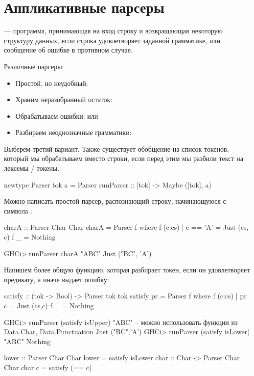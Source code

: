 \documentclass[11pt,a4paper]{article}
\begin{document}
\section{Аппликативные парсеры}
\begin{defn}
	 --- программа, принимающая на вход строку и возвращающая некоторую структуру данных, если строка удовлетворяет заданной грамматике, или сообщение об ошибке в противном случае.
\end{defn}
Различные парсеры:
\begin{itemize}
	\item Простой, но неудобный: 
	\item Храним неразобранный остаток: 
	\item Обрабатываем ошибки:  или 

	\item Разбираем неоднозначные грамматики: 
\end{itemize}
Выберем третий вариант. Также существует обобщение на список токенов, который мы обрабатываем вместо строки, если перед этим мы разбили текст на лексемы / токены.
\begin{hscode}
newtype Parser tok a = Parser { runParser :: [tok] -> Maybe ([tok], a) }
\end{hscode}
Можно написать простой парсер, распознающий строку, начинающуюся с символа :
\begin{hscode}
charA :: Parser Char Char
charA = Parser f where
  f (c:cs) | c == 'A' = Just (cs, c)
  f _ = Nothing

GHCi> runParser charA "ABC"
Just ("BC", 'A')
\end{hscode}
Напишем более общую функцию, которая разбирает токен, если он удовлетворяет предикату, а иначе выдает ошибку:
\begin{hscode}
satisfy :: (tok -> Bool) -> Parser tok tok
satisfy pr = Parser f where
	f (c:cs) | pr c = Just (cs,c)
	f _ = Nothing

GHCi> runParser (satisfy isUpper) "ABC"  -- можно использовать функции из Data.Char, Data.Punctuation 
Just ("BC",'A')
GHCi> runParser (satisfy isLower) "ABC"
Nothing

lower :: Parser Char Char
lower = satisfy isLower
char :: Char -> Parser Char Char
char c = satisfy (== c) 
\end{hscode}
\end{document}
